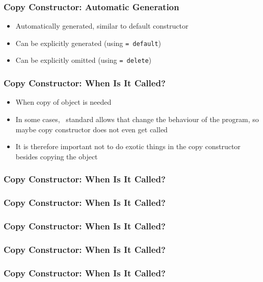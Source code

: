 \documentclass{../ucll-slides}
\begin{document}
\begin{frame}
  \frametitle{Copy Constructor: Automatic Generation}
  \begin{itemize}
    \item Automatically generated, similar  to default constructor
    \item Can be explicitly generated (using {\tt = default})
    \item Can be explicitly omitted (using {\tt = delete})
  \end{itemize}
\end{frame}

\begin{frame}
  \frametitle{Copy Constructor: When Is It Called?}
  \begin{itemize}
    \item When copy of object is needed
    \item In some cases, \cpp\ standard allows 
          that change the behaviour of the program, so maybe copy constructor does not even get called
    \item It is therefore important not to do exotic things in the copy constructor besides copying the object
  \end{itemize}
\end{frame}

\begin{frame}
  \frametitle{Copy Constructor: When Is It Called?}
\end{frame}

\begin{frame}
  \frametitle{Copy Constructor: When Is It Called?}
\end{frame}

\begin{frame}
  \frametitle{Copy Constructor: When Is It Called?}
\end{frame}

\begin{frame}
  \frametitle{Copy Constructor: When Is It Called?}
\end{frame}

\begin{frame}
  \frametitle{Copy Constructor: When Is It Called?}
\end{frame}
\end{document}
